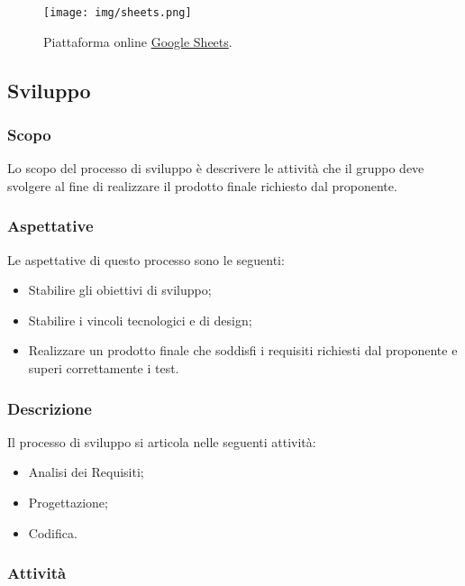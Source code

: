 \documentclass[../norme-di-progetto.tex]{subfiles}
\begin{document}
\begin{figure}[H]
  \centering
  \texttt{[image: img/sheets.png]}
  \label{fig:sheets}
  \caption{Piattaforma online \href{https://docs.google.com/spreadsheets/u/0/}{Google Sheets}.}
\end{figure}

\subsection{Sviluppo}

\subsubsection{Scopo}
Lo scopo del processo di sviluppo è descrivere le attività che il gruppo deve svolgere al fine di realizzare il prodotto finale richiesto dal proponente.

\subsubsection{Aspettative}
Le aspettative di questo processo sono le seguenti:
\begin{itemize}
  \item Stabilire gli obiettivi di sviluppo;
  \item Stabilire i vincoli tecnologici e di design;
  \item Realizzare un prodotto finale che soddisfi i requisiti richiesti dal proponente e superi correttamente i test.
\end{itemize}

\subsubsection{Descrizione}
Il processo di sviluppo si articola nelle seguenti attività:
\begin{itemize}
  \item Analisi dei Requisiti;
  \item Progettazione;
  \item Codifica.
\end{itemize}

\subsubsection{Attività}
\end{document}
